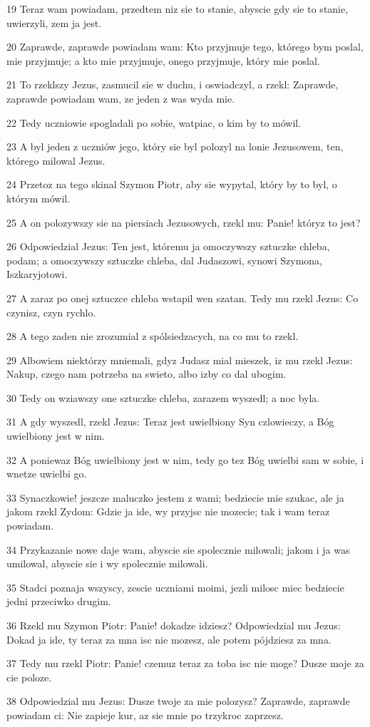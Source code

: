 \par 19 Teraz wam powiadam, przedtem niz sie to stanie, abyscie gdy sie to stanie, uwierzyli, zem ja jest.
\par 20 Zaprawde, zaprawde powiadam wam: Kto przyjmuje tego, którego bym poslal, mie przyjmuje; a kto mie przyjmuje, onego przyjmuje, który mie poslal.
\par 21 To rzeklszy Jezus, zasmucil sie w duchu, i oswiadczyl, a rzekl: Zaprawde, zaprawde powiadam wam, ze jeden z was wyda mie.
\par 22 Tedy uczniowie spogladali po sobie, watpiac, o kim by to mówil.
\par 23 A byl jeden z uczniów jego, który sie byl polozyl na lonie Jezusowem, ten, którego milowal Jezus.
\par 24 Przetoz na tego skinal Szymon Piotr, aby sie wypytal, który by to byl, o którym mówil.
\par 25 A on polozywszy sie na piersiach Jezusowych, rzekl mu: Panie! któryz to jest?
\par 26 Odpowiedzial Jezus: Ten jest, któremu ja omoczywszy sztuczke chleba, podam; a omoczywszy sztuczke chleba, dal Judaszowi, synowi Szymona, Iszkaryjotowi.
\par 27 A zaraz po onej sztuczce chleba wstapil wen szatan. Tedy mu rzekl Jezus: Co czynisz, czyn rychlo.
\par 28 A tego zaden nie zrozumial z spólsiedzacych, na co mu to rzekl.
\par 29 Albowiem niektórzy mniemali, gdyz Judasz mial mieszek, iz mu rzekl Jezus: Nakup, czego nam potrzeba na swieto, albo izby co dal ubogim.
\par 30 Tedy on wziawszy one sztuczke chleba, zarazem wyszedl; a noc byla.
\par 31 A gdy wyszedl, rzekl Jezus: Teraz jest uwielbiony Syn czlowieczy, a Bóg uwielbiony jest w nim.
\par 32 A poniewaz Bóg uwielbiony jest w nim, tedy go tez Bóg uwielbi sam w sobie, i wnetze uwielbi go.
\par 33 Synaczkowie! jeszcze maluczko jestem z wami; bedziecie mie szukac, ale ja jakom rzekl Zydom: Gdzie ja ide, wy przyjsc nie mozecie; tak i wam teraz powiadam.
\par 34 Przykazanie nowe daje wam, abyscie sie spolecznie milowali; jakom i ja was umilowal, abyscie sie i wy spolecznie milowali.
\par 35 Stadci poznaja wszyscy, zescie uczniami moimi, jezli milosc miec bedziecie jedni przeciwko drugim.
\par 36 Rzekl mu Szymon Piotr: Panie! dokadze idziesz? Odpowiedzial mu Jezus: Dokad ja ide, ty teraz za mna isc nie mozesz, ale potem pójdziesz za mna.
\par 37 Tedy mu rzekl Piotr: Panie! czemuz teraz za toba isc nie moge? Dusze moje za cie poloze.
\par 38 Odpowiedzial mu Jezus: Dusze twoje za mie polozysz? Zaprawde, zaprawde powiadam ci: Nie zapieje kur, az sie mnie po trzykroc zaprzesz.


